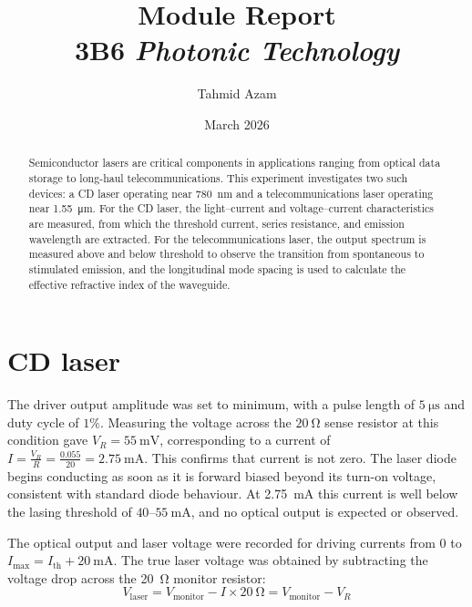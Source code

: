 \documentclass[a4paper, 10pt]{article}
\title{Module Report\\[0.5em]
\Large 3B6 \textit{Photonic Technology}}
\author[1]{Tahmid Azam}
\affil[1]{Emmanuel College, University of Cambridge}
\date{March 2026}
\begin{document}
\maketitle

\begin{abstract}
    Semiconductor lasers are critical components in applications ranging from optical data storage to long-haul telecommunications. This experiment investigates two such devices: a CD laser operating near \SI{780}{\nano\metre} and a telecommunications laser operating near \SI{1.55}{\micro\metre}. For the CD laser, the light--current and voltage--current characteristics are measured, from which the threshold current, series resistance, and emission wavelength are extracted. For the telecommunications laser, the output spectrum is measured above and below threshold to observe the transition from spontaneous to stimulated emission, and the longitudinal mode spacing is used to calculate the effective refractive index of the waveguide.
\end{abstract}

\section{CD laser}

The driver output amplitude was set to minimum, with a pulse length of $\SI{5}{\micro\second}$
and duty cycle of $1\%$. Measuring the voltage across the $\SI{20}{\ohm}$ sense resistor at this condition gave
$V_R = \SI{55}{\milli\volt}$, corresponding to a current of $I = \frac{V_R}{R} = \frac{0.055}{20} = \SI{2.75}{\milli\ampere}$.
This confirms that current is not zero.
The laser diode begins conducting as soon as it is forward biased beyond its
turn-on voltage, consistent with standard diode behaviour.
At \SI{2.75}{\milli\ampere} this current is well below the lasing threshold of $40$--$\SI{55}{\milli\ampere}$, and no optical output is expected or observed.

The optical output and laser voltage were recorded for driving currents from 0 to $I_\mathrm{max} = I_\mathrm{th} + \qty{20}{\milli\ampere}$. The true laser voltage was obtained by subtracting the voltage drop across the \SI{20}{\ohm} monitor resistor:
\begin{equation*}
    V_\mathrm{laser} = V_\mathrm{monitor} - I \times \SI{20}{\ohm} = V_\mathrm{monitor} - V_R
\end{equation*}
\end{document}
